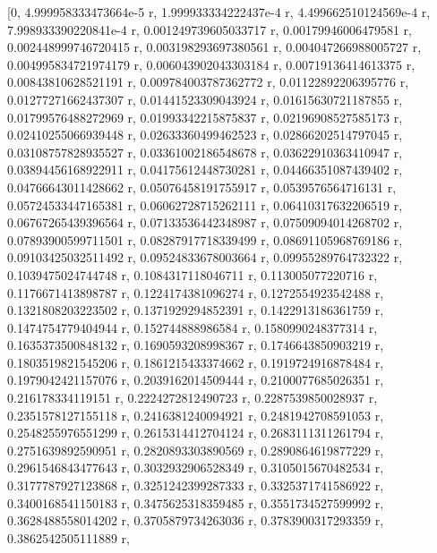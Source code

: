 \documentclass[a4paper,10pt]{article}
\begin{document}
\begin{eulernotebook}
\begin{eulercomment}
\begin{eulercomment}
\begin{eulercomment}
\begin{eulercomment}
\begin{eulercomment}
\begin{eulercomment}
\begin{eulercomment}
\begin{eulercomment}
\begin{eulercomment}
\begin{eulercomment}
\begin{eulercomment}
\begin{eulercomment}
\begin{eulercomment}
\begin{eulercomment}
\begin{eulercomment}
\begin{eulercomment}
\begin{eulercomment}
\begin{eulercomment}
\begin{eulercomment}
\begin{eulercomment}
\begin{eulercomment}
\begin{eulercomment}
\begin{eulercomment}
\begin{eulercomment}
\begin{eulercomment}
\begin{eulercomment}
\begin{eulercomment}
\begin{eulercomment}
\begin{euleroutput}
          [0, 4.999958333473664e-5 r, 1.999933334222437e-4 r, 
  4.499662510124569e-4 r, 7.998933390220841e-4 r, 
  0.001249739605033717 r, 0.00179946006479581 r, 
  0.002448999746720415 r, 0.003198293697380561 r, 
  0.004047266988005727 r, 0.004995834721974179 r, 
  0.006043902043303184 r, 0.00719136414613375 r, 0.00843810628521191 r, 
  0.009784003787362772 r, 0.01122892206395776 r, 0.01277271662437307 r, 
  0.01441523309043924 r, 0.01615630721187855 r, 0.01799576488272969 r, 
  0.01993342215875837 r, 0.02196908527585173 r, 0.02410255066939448 r, 
  0.02633360499462523 r, 0.02866202514797045 r, 0.03108757828935527 r, 
  0.03361002186548678 r, 0.03622910363410947 r, 0.03894456168922911 r, 
  0.04175612448730281 r, 0.04466351087439402 r, 0.04766643011428662 r, 
  0.05076458191755917 r, 0.0539576564716131 r, 0.05724533447165381 r, 
  0.06062728715262111 r, 0.06410317632206519 r, 0.06767265439396564 r, 
  0.07133536442348987 r, 0.07509094014268702 r, 0.07893900599711501 r, 
  0.08287917718339499 r, 0.08691105968769186 r, 0.09103425032511492 r, 
  0.09524833678003664 r, 0.09955289764732322 r, 0.1039475024744748 r, 
  0.1084317118046711 r, 0.113005077220716 r, 0.1176671413898787 r, 
  0.1224174381096274 r, 0.1272554923542488 r, 0.1321808203223502 r, 
  0.1371929294852391 r, 0.1422913186361759 r, 0.1474754779404944 r, 
  0.152744888986584 r, 0.1580990248377314 r, 0.1635373500848132 r, 
  0.1690593208998367 r, 0.1746643850903219 r, 0.1803519821545206 r, 
  0.1861215433374662 r, 0.1919724916878484 r, 0.1979042421157076 r, 
  0.2039162014509444 r, 0.2100077685026351 r, 0.216178334119151 r, 
  0.2224272812490723 r, 0.2287539850028937 r, 0.2351578127155118 r, 
  0.2416381240094921 r, 0.2481942708591053 r, 0.2548255976551299 r, 
  0.2615314412704124 r, 0.2683111311261794 r, 0.2751639892590951 r, 
  0.2820893303890569 r, 0.2890864619877229 r, 0.2961546843477643 r, 
  0.3032932906528349 r, 0.3105015670482534 r, 0.3177787927123868 r, 
  0.3251242399287333 r, 0.3325371741586922 r, 0.3400168541150183 r, 
  0.3475625318359485 r, 0.3551734527599992 r, 0.3628488558014202 r, 
  0.3705879734263036 r, 0.3783900317293359 r, 0.3862542505111889 r, 

\end{euleroutput}
\end{eulercomment}
\end{eulercomment}
\end{eulercomment}
\end{eulercomment}
\end{eulercomment}
\end{eulercomment}
\end{eulercomment}
\end{eulercomment}
\end{eulercomment}
\end{eulercomment}
\end{eulercomment}
\end{eulercomment}
\end{eulercomment}
\end{eulercomment}
\end{eulercomment}
\end{eulercomment}
\end{eulercomment}
\end{eulercomment}
\end{eulercomment}
\end{eulercomment}
\end{eulercomment}
\end{eulercomment}
\end{eulercomment}
\end{eulercomment}
\end{eulercomment}
\end{eulercomment}
\end{eulercomment}
\end{eulercomment}
\end{eulernotebook}
\end{document}
